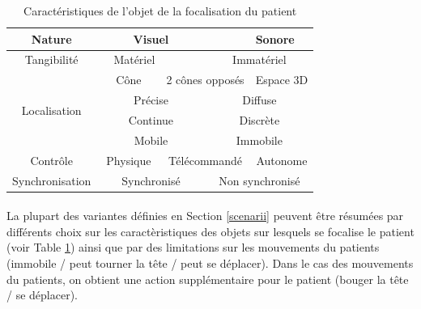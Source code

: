 \documentclass[french]{article}
\begin{document}
\begin{table}[h]
	\begin{tabular}
		{|c|p{}p{}p{}
		p{}p{}p{}|}
		\hline
		Nature                                & \multicolumn{3}{|c|}{Visuel}     &
		                                      & \centering Sonore                &                       \\
		\hline
		Tangibilité                           &                                  & \centering Matériel &
		                                      & \multicolumn{3}{|c|}{Immatériel}                         \\
		\hline
		\multirow{4}{*}{ Localisation }       &
		\multicolumn{2}{|c|}{Cône}            &
		\multicolumn{2}{|c|}{2 cônes opposés} &
		\multicolumn{2}{|c|}{Espace 3D}                                                                  \\
		\cline{2-7}
		                                      & \multicolumn{3}{|c|}{Précise}
		                                      & \multicolumn{3}{|c|}{Diffuse}                            \\
		\cline{2-7}
		                                      & \multicolumn{3}{|c|}{Continue}
		                                      & \multicolumn{3}{|c|}{Discrète}
		\\
		\cline{2-7}
		                                      & \multicolumn{3}{|c|}{Mobile}
		                                      & \multicolumn{3}{|c|}{Immobile}
		\\
		\hline
		Contrôle                              &
		\multicolumn{2}{|c|}{Physique}        &
		\multicolumn{2}{|c|}{Télécommandé}    &
		\multicolumn{2}{|c|}{Autonome}
		\\
		\hline
		Synchronisation  & \multicolumn{3}{|c|}{Synchronisé}
		& \multicolumn{3}{|c|}{Non synchronisé}\\
		\hline
	\end{tabular}
	\caption{Caractéristiques de l'objet de la focalisation du patient}
	\label{objet-carac}
\end{table}

\paragraph{}
La plupart des variantes définies en Section \ref{scenarii} peuvent être résumées par différents choix sur les caractèristiques des objets sur lesquels se focalise le patient (voir Table \ref{objet-carac}) ainsi que par des limitations sur les mouvements du patients (immobile / peut tourner la tête / peut se déplacer). Dans le cas des mouvements du patients, on obtient une action supplémentaire pour le patient (bouger la tête / se déplacer).
\end{document}
